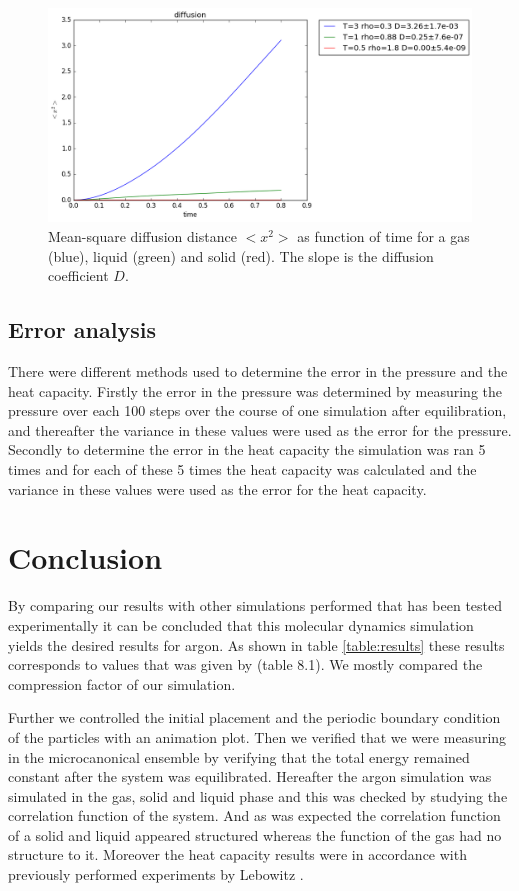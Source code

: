 \documentclass[12pt,a4paper]{report}
\begin{document}
\begin{figure}[H]
\centering
\includegraphics[scale=0.5]{diffusion.png}
\caption{Mean-square diffusion distance $<x^2>$ as function of time for a gas (blue), liquid (green) and solid (red). The slope is the diffusion coefficient $D$.}
\label{fig:diffusion}
\end{figure}

\section{Error analysis}

There were different methods used to determine the error in the pressure and the heat capacity. Firstly the error in the pressure was determined by measuring the pressure over each 100 steps over the course of one simulation after equilibration, and thereafter the variance in these values were used as the error for the pressure. Secondly to determine the error in the heat capacity the simulation was ran 5 times and for each of these 5 times the heat capacity was calculated and the variance in these values were used as the error for the heat capacity.

\chapter{Conclusion}

By comparing our results with other simulations performed that has been tested experimentally it can be concluded that this molecular dynamics simulation yields the desired results for argon. As shown in table \ref{table:results} these results corresponds to values that was given by \cite{thijssen} (table 8.1). We mostly compared the compression factor of our simulation.

Further we controlled the initial placement and the periodic boundary condition of the particles with an animation plot. Then we verified that we were measuring in the microcanonical ensemble by verifying that the total energy remained constant after the system was equilibrated. Hereafter the argon simulation was simulated in the gas, solid and liquid phase and this was checked by studying the correlation function of the system. And as was expected the correlation function of a solid and liquid appeared structured whereas the function of the gas had no structure to it. Moreover the heat capacity results were in accordance 
with previously performed experiments by Lebowitz \cite{lebowitz1967}. 
\end{document}
